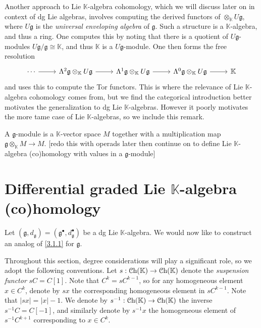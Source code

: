 \begin{discussion}\label{3.1.5}
	Another approach to Lie $\mathbb{K} $-algebra cohomology, which we will discuss later on in context of dg Lie algebras, involves computing the derived functors of $\otimes_\mathbb{K} U\mathfrak{g} $, where $U\mathfrak{g} $ is the \emph{universal enveloping algebra} of $\mathfrak{g} $. Such a structure is a $\mathbb{K} $-algebra, and thus a ring. One computes this by noting that there is a quotient of $U\mathfrak{g}$-modules $U\mathfrak{g} /\mathfrak{g} \cong \mathbb{K} $, and thus $\mathbb{K} $ is a $U\mathfrak{g} $-module. One then forms the free resolution
	\[\begin{tikzcd}[row sep = 2.5em, column sep = 2.5em]
		\cdots \ar[r]  & \Lambda ^2\mathfrak{g} \otimes _\mathbb{K} U\mathfrak{g} \ar[r]  & \Lambda ^1\mathfrak{g} \otimes _\mathbb{K} U\mathfrak{g} \ar[r]  & \Lambda ^0\mathfrak{g} \otimes_\mathbb{K} U\mathfrak{g} \ar[r]  & \mathbb{K} 
	\end{tikzcd}\]
	and uses this to compute the Tor functors. This is where the relevance of Lie $\mathbb{K} $-algebra cohomology comes from, but we find the categorical introduction better motivates the generalization to dg Lie $\mathbb{K} $-algebras. However it poorly motivates the more tame case of Lie $\mathbb{K} $-algebras, so we include this remark.
\end{discussion}

\begin{definition}\label{3.1.6}
	A $\mathfrak{g} $-module is a $\mathbb{K} $-vector space $M$ together with a multiplication map $\mathfrak{g} \otimes_\mathbb{K} M\to M$. [redo this with operads later then continue on to define Lie $\mathbb{K} $-algebra (co)homology with values in a $\mathfrak{g} $-module]
\end{definition}




\section{Differential graded Lie $\mathbb{K} $-algebra (co)homology}\label{sec:3.2}

Let $(\mathfrak{g},d_\mathfrak{g} )=(\mathfrak{g} ^{\bullet},d^{\bullet} _\mathfrak{g} ) $ be a dg Lie $\mathbb{K} $-algebra. We would now like to construct an analog of \cref{3.1.1} for $\mathfrak{g} $.

Throughout this section, degree considerations will play a significant role, so we adopt the following conventions. Let $s : \mathcal{C}\mathrm{h}(\mathbb{K} )  \to \mathcal{C}\mathrm{h}(\mathbb{K} ) $ denote the \emph{suspension functor} $sC=C[1]$. Note that $C^k=sC^{k-1} $, so for any homogeneous element $x\in C^k$, denote by $sx$ the corresponding homogeneous element in $sC^{k-1} $. Note that $\left| sx \right| =\left| x \right| -1$. We denote by $s ^{-1} : \mathcal{C}\mathrm{h}(\mathbb{K} )  \to \mathcal{C}\mathrm{h}(\mathbb{K} ) $ the inverse $s ^{-1} C=C[-1]$, and similarly denote by $s ^{-1} x$ the homogeneous element of $s ^{-1} C^{k+1} $ corresponding to $x\in C^k$.

